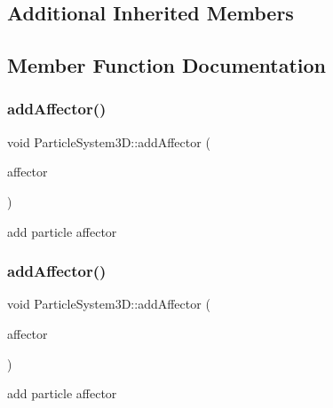 \subsection*{Additional Inherited Members}


\subsection{Member Function Documentation}
\mbox{\label{classParticleSystem3D_ae724cd8008b8ef3206659c4fedbf7339}} 
\subsubsection{\texorpdfstring{add\+Affector()}{addAffector()}\hspace{0.1cm}{\footnotesize\ttfamily [1/2]}}
{\footnotesize\ttfamily void Particle\+System3\+D\+::add\+Affector (\begin{DoxyParamCaption}\item[{\hyperlink{classParticle3DAffector}{Particle3\+D\+Affector} $\ast$}]{affector }\end{DoxyParamCaption})}

add particle affector \mbox{\label{classParticleSystem3D_ae724cd8008b8ef3206659c4fedbf7339}} 
\subsubsection{\texorpdfstring{add\+Affector()}{addAffector()}\hspace{0.1cm}{\footnotesize\ttfamily [2/2]}}
{\footnotesize\ttfamily void Particle\+System3\+D\+::add\+Affector (\begin{DoxyParamCaption}\item[{\hyperlink{classParticle3DAffector}{Particle3\+D\+Affector} $\ast$}]{affector }\end{DoxyParamCaption})}

add particle affector \mbox{\label{classParticleSystem3D_a78e6969723062a91ffbd46b08dd0fcb2}} 
